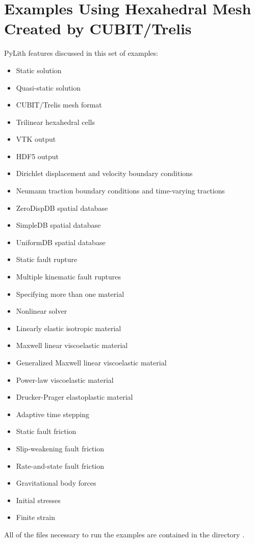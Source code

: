 \section{Examples Using Hexahedral Mesh Created by CUBIT/Trelis}
\label{sec:example:3dhex8}

PyLith features discussed in this set of examples:
\begin{itemize}
\item Static solution
\item Quasi-static solution
\item CUBIT/Trelis mesh format
\item Trilinear hexahedral cells
\item VTK output
\item HDF5 output
\item Dirichlet displacement and velocity boundary conditions
\item Neumann traction boundary conditions and time-varying tractions
\item ZeroDispDB spatial database
\item SimpleDB spatial database
\item UniformDB spatial database
\item Static fault rupture
\item Multiple kinematic fault ruptures
\item Specifying more than one material
\item Nonlinear solver
\item Linearly elastic isotropic material
\item Maxwell linear viscoelastic material
\item Generalized Maxwell linear viscoelastic material
\item Power-law viscoelastic material
\item Drucker-Prager elastoplastic material
\item Adaptive time stepping
\item Static fault friction
\item Slip-weakening fault friction
\item Rate-and-state fault friction
\item Gravitational body forces
\item Initial stresses
\item Finite strain
\end{itemize}
All of the files necessary to run the examples are contained in the
directory .


